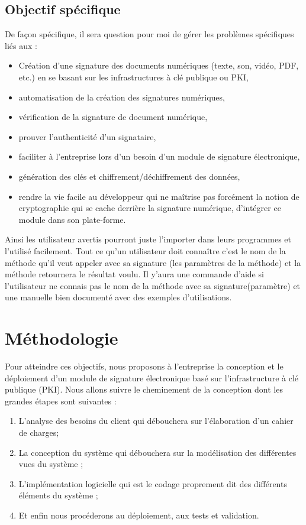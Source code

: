 		\subsection{Objectif spécifique}
			De façon spécifique, il sera question pour moi de gérer les problèmes spécifiques liés aux :
			\begin{itemize}
				\item Création d'une signature des documents numériques (texte, son, vidéo, PDF, etc.) en se basant sur les infrastructures à clé publique ou PKI,
				\item automatisation de la création des signatures numériques,
				\item vérification de la signature de document numérique,
				\item prouver l'authenticité d'un signataire,
				\item faciliter à l'entreprise lors d'un besoin d'un module de signature électronique,
				\item génération des clés et chiffrement/déchiffrement des données,
			
				\item rendre la vie facile au développeur qui ne maîtrise pas forcément  la notion de cryptographie qui se cache derrière la signature numérique, d'intégrer ce module dans son plate-forme.\\
			\end{itemize}
			Ainsi les utilisateur avertis pourront juste l'importer dans leurs programmes et l'utilisé facilement. Tout ce qu'un utilisateur doit connaître c'est le nom de la méthode qu'il veut appeler avec sa signature (les paramètres de la méthode) et la méthode retournera le résultat voulu. Il y'aura une commande d'aide si l'utilisateur ne connais pas le nom de la méthode  avec sa signature(paramètre) et une manuelle bien documenté avec des exemples d'utilisations.	
			
		
	\section{Méthodologie}
		Pour atteindre ces objectifs, nous proposons à l'entreprise la conception et le déploiement d'un module de signature électronique basé sur l'infrastructure à clé publique (PKI). Nous allons suivre le cheminement de la conception dont  les grandes étapes sont suivantes :
		\begin{enumerate}
			\item  L’analyse des besoins du client qui débouchera sur l’élaboration d’un cahier de charges;
			\item  La conception du système qui débouchera sur la modélisation des différentes vues du système ;
			\item  L’implémentation logicielle qui est le codage proprement dit des différents éléments du système ;
			\item  Et enfin nous procéderons au déploiement, aux tests et validation.
		\end{enumerate}
